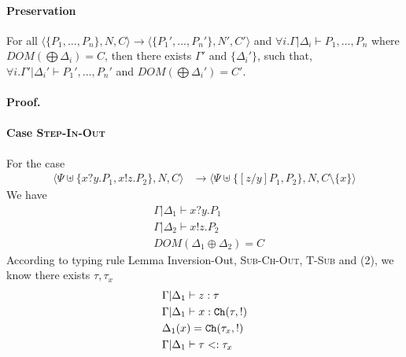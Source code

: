 \documentclass[master,english]{kuisthesis}
\theoremstyle{definition}
\begin{document}
\paragraph{Preservation} For all $\langle\{P_1, ...,P_n \}, N, C\rangle \longrightarrow \langle\{P_1', ..., P_n' \}, N', C'\rangle$ and $\forall i. \Gamma | \Delta_i \vdash P_1, ...,P_n$ where $\mathit{DOM}(\bigoplus \Delta_i) = C$, then there exists $\Gamma'$ and $\{\Delta_i'\}$, such that, $\forall i. \Gamma' | \Delta_i' \vdash P_1', ..., P_n'$ and $\mathit{DOM}(\bigoplus \Delta_i') = C'$.

\paragraph{Proof.}

\paragraph{Case \textsc{Step-In-Out}} For the case
\begin{align*}
    \langle\Psi \uplus\{x?y.P_1, x!z.P_2\}, N, C\rangle &\longrightarrow \langle\Psi \uplus\{[z / y]P_1, P_2\}, N, C \setminus \{x\}\rangle
\end{align*}\noindent
We have
\begin{align}
    &\Gamma | \Delta_1 \vdash x?y.P_1
    \\&\Gamma | \Delta_2 \vdash x!z.P_2
    \\&DOM(\Delta_1 \oplus \Delta_2) = C
\end{align}\noindent
According to typing rule Lemma Inversion-Out, \textsc{Sub-Ch-Out}, \textsc{T-Sub} and (2), we know there exists $\tau, \tau_x$
\begin{align}
    &\Gamma | \Delta_1 \vdash z : \tau
    \\&\Gamma | \Delta_1 \vdash x : {\tt Ch}({\tau, !})
    \\&\Delta_1(x) = {\tt Ch}({\tau_x, !})
    \\&\Gamma | \Delta_1 \vdash \tau <: \tau_x
\end{align}\noindent
\end{document}
